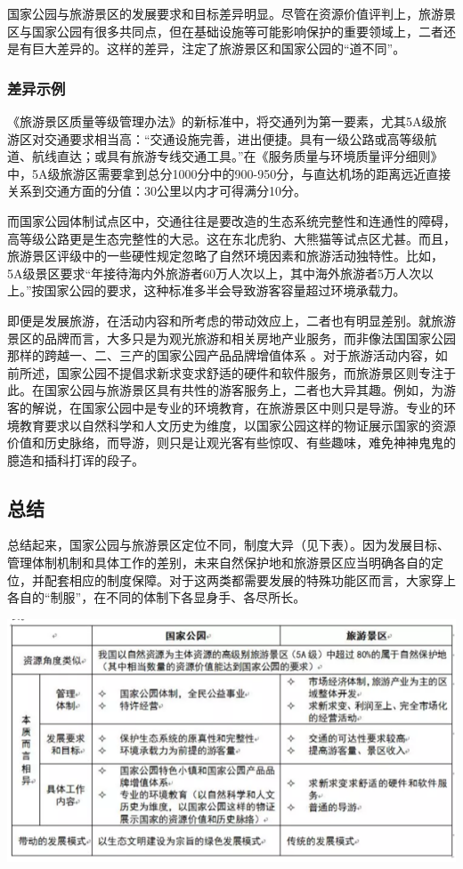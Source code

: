 \documentclass[
]{book}
\begin{document}
国家公园与旅游景区的发展要求和目标差异明显。尽管在资源价值评判上，旅游景区与国家公园有很多共同点，但在基础设施等可能影响保护的重要领域上，二者还是有巨大差异的。这样的差异，注定了旅游景区和国家公园的``道不同''。

\hypertarget{ux5deeux5f02ux793aux4f8b}{%
\subsubsection{差异示例}\label{ux5deeux5f02ux793aux4f8b}}

《旅游景区质量等级管理办法》的新标准中，将交通列为第一要素，尤其5A级旅游区对交通要求相当高：``交通设施完善，进出便捷。具有一级公路或高等级航道、航线直达；或具有旅游专线交通工具。''在《服务质量与环境质量评分细则》中，5A级旅游区需要拿到总分1000分中的900-950分，与直达机场的距离远近直接关系到交通方面的分值：30公里以内才可得满分10分。

而国家公园体制试点区中，交通往往是要改造的生态系统完整性和连通性的障碍，高等级公路更是生态完整性的大忌。这在东北虎豹、大熊猫等试点区尤甚。而且，旅游景区评级中的一些硬性规定忽略了自然环境因素和旅游活动独特性。比如，5A级景区要求``年接待海内外旅游者60万人次以上，其中海外旅游者5万人次以上。''按国家公园的要求，这种标准多半会导致游客容量超过环境承载力。

即便是发展旅游，在活动内容和所考虑的带动效应上，二者也有明显差别。就旅游景区的品牌而言，大多只是为观光旅游和相关房地产业服务，而非像法国国家公园那样的跨越一、二、三产的国家公园产品品牌增值体系 。对于旅游活动内容，如前所述，国家公园不提倡求新求变求舒适的硬件和软件服务，而旅游景区则专注于此。在国家公园与旅游景区具有共性的游客服务上，二者也大异其趣。例如，为游客的解说，在国家公园中是专业的环境教育，在旅游景区中则只是导游。专业的环境教育要求以自然科学和人文历史为维度，以国家公园这样的物证展示国家的资源价值和历史脉络，而导游，则只是让观光客有些惊叹、有些趣味，难免神神鬼鬼的臆造和插科打诨的段子。

\hypertarget{ux603bux7ed3}{%
\subsection{总结}\label{ux603bux7ed3}}

总结起来，国家公园与旅游景区定位不同，制度大异（见下表）。因为发展目标、管理体制机制和具体工作的差别，未来自然保护地和旅游景区应当明确各自的定位，并配套相应的制度保障。对于这两类都需要发展的特殊功能区而言，大家穿上各自的``制服''，在不同的体制下各显身手、各尽所长。

\includegraphics[width=8.33in]{images/park6}
\end{document}
